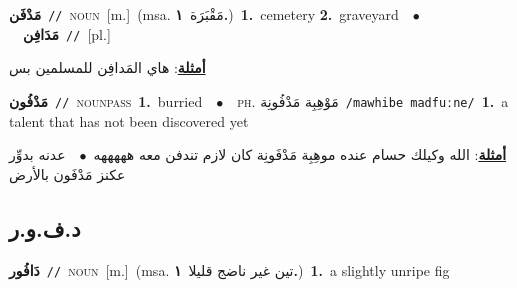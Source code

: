 \documentclass[10pt,a4paper,twoside]{article} %
\begin{document}
\begin{multicols}{2}
{\setlength\topsep{0pt}\textbf{\foreignlanguage{arabic}{مَدْفَن}}\ {\color{gray}\texttt{//}\color{black}}\ \textsc{noun}\ [m.]\ \color{gray}(msa. \foreignlanguage{arabic}{مَقْبَرَة}~\foreignlanguage{arabic}{\textbf{١.}})\color{black}\ \textbf{1.}~cemetery  \textbf{2.}~graveyard\ \ $\bullet$\ \ \setlength\topsep{0pt}\textbf{\foreignlanguage{arabic}{مَدَافِن}}\ {\color{gray}\texttt{//}\color{black}}\ [pl.]\  \begin{flushright}\color{gray}\foreignlanguage{arabic}{\textbf{\underline{\foreignlanguage{arabic}{أمثلة}}}: هاي المَدافِن للمسلمين بس}\end{flushright}\color{black}} \vspace{2mm}

{\setlength\topsep{0pt}\textbf{\foreignlanguage{arabic}{مَدْفُون}}\ {\color{gray}\texttt{//}\color{black}}\ \textsc{noun\textunderscore pass}\ \textbf{1.}~burried\ \ $\bullet$\ \ \textsc{ph.} \color{gray} \foreignlanguage{arabic}{مَوْهِبِة مَدْفُونِة}\color{black}\ {\color{gray}\texttt{/{\sffamily mawhibe madfuːne}/}\color{black}}\ \textbf{1.}~a talent that has not been discovered yet\  \begin{flushright}\color{gray}\foreignlanguage{arabic}{\textbf{\underline{\foreignlanguage{arabic}{أمثلة}}}: الله وكيلك حسام عنده موهِبِة مَدْفَونِة كان لازم تندفن معه هههههه\ $\bullet$\ \  عدنه بدوِّر عكنز مَدْفَون بالأرض}\end{flushright}\color{black}} \vspace{2mm}

\vspace{-3mm}
\subsection*{\color{blue}\foreignlanguage{arabic}{د.ف.و.ر}\color{blue}{ (ntws)}} 

{\setlength\topsep{0pt}\textbf{\foreignlanguage{arabic}{دَافُور}}\ {\color{gray}\texttt{//}\color{black}}\ \textsc{noun}\ [m.]\ \color{gray}(msa. \foreignlanguage{arabic}{تين غير ناضج قليلا}~\foreignlanguage{arabic}{\textbf{١.}})\color{black}\ \textbf{1.}~a slightly unripe fig\ } \vspace{2mm}


\end{multicols}
\end{document}
